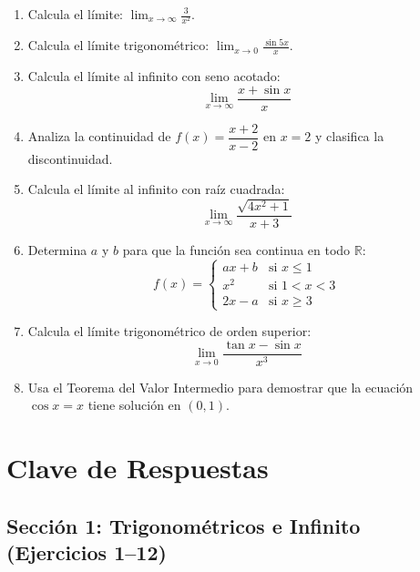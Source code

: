 \documentclass[12pt, letterpaper]{article}
\begin{document}
\begin{enumerate}[resume=ejercicios, leftmargin=*]
  \item \facil{} Calcula el límite: $\displaystyle\lim_{x \to \infty} \frac{3}{x^2}$.

  \item \medio{} Calcula el límite trigonométrico: $\displaystyle\lim_{x \to 0} \frac{\sin 5x}{x}$.

  \item \medio{} Calcula el límite al infinito con seno acotado:
        $$\lim_{x \to \infty} \frac{x + \sin x}{x}$$

  \item \medio{} Analiza la continuidad de $f(x) = \dfrac{x + 2}{x - 2}$ en $x = 2$ y clasifica la discontinuidad.

  \item \dificil{} Calcula el límite al infinito con raíz cuadrada:
        $$\lim_{x \to \infty} \frac{\sqrt{4x^2 + 1}}{x + 3}$$

  \item \dificil{} Determina $a$ y $b$ para que la función sea continua en todo $\mathbb{R}$:
        $$f(x) = \begin{cases} ax + b & \text{si } x \le 1 \\ x^2 & \text{si } 1 < x < 3 \\ 2x - a & \text{si } x \ge 3 \end{cases}$$

  \item \muyDificil{} Calcula el límite trigonométrico de orden superior:
        $$\lim_{x \to 0} \frac{\tan x - \sin x}{x^3}$$

  \item \muyDificil{} Usa el Teorema del Valor Intermedio para demostrar que la ecuación $\cos x = x$ tiene solución en $(0, 1)$.
\end{enumerate}
\newpage
\ifmwclaves
  \section{Clave de Respuestas}

  \subsection*{Sección 1: Trigonométricos e Infinito (Ejercicios 1--12)}
\end{document}
